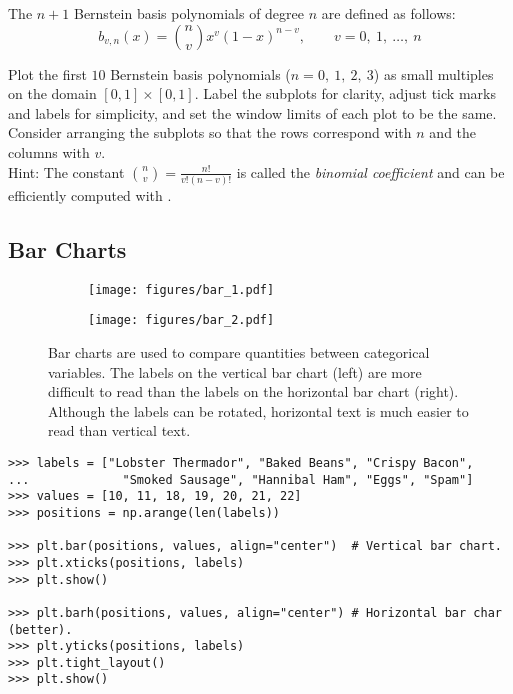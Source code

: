 
\begin{problem} %
The $n+1$ Bernstein basis polynomials of degree $n$ are defined as follows:
\[b_{v,n}(x) = {{n} \choose {v}} x^v (1-x)^{n-v},\qquad v = 0,\ 1,\ \ldots,\ n\]

Plot the first $10$ Bernstein basis polynomials ($n = 0,\ 1,\ 2,\ 3$) as small multiples on the domain $[0,1] \times [0,1]$.
Label the subplots for clarity, adjust tick marks and labels for simplicity, and set the window limits of each plot to be the same.
Consider arranging the subplots so that the rows correspond with $n$ and the columns with $v$.
\\Hint: The constant ${{n} \choose {v}} = \frac{n!}{v!(n-v)!}$ is called the \emph{binomial coefficient} and can be efficiently computed with .
\end{problem}

\subsection*{Bar Charts} %

\begin{figure}[H] %
    \centering
    \begin{subfigure}{.47\textwidth}
        \centering
        \texttt{[image: figures/bar\_1.pdf]}
    \end{subfigure}
    \begin{subfigure}{.52\textwidth}
        \centering
        \texttt{[image: figures/bar\_2.pdf]}
    \end{subfigure}
    \caption{Bar charts are used to compare quantities between categorical variables. The labels on the vertical bar chart (left) are more difficult to read than the  labels on the horizontal bar chart (right). Although the labels can be rotated, horizontal text is much easier to read than vertical text.}
\end{figure}

\begin{lstlisting}
>>> labels = ["Lobster Thermador", "Baked Beans", "Crispy Bacon",
...             "Smoked Sausage", "Hannibal Ham", "Eggs", "Spam"]
>>> values = [10, 11, 18, 19, 20, 21, 22]
>>> positions = np.arange(len(labels))

>>> plt.bar(positions, values, align="center")  # Vertical bar chart.
>>> plt.xticks(positions, labels)
>>> plt.show()

>>> plt.barh(positions, values, align="center") # Horizontal bar char (better).
>>> plt.yticks(positions, labels)
>>> plt.tight_layout()
>>> plt.show()
\end{lstlisting}

